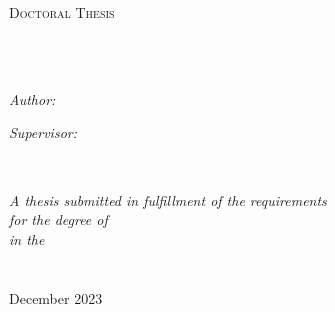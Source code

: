 \documentclass[
11pt, 
english, 
doublespacing, %
headsepline, %
usenames,dvipsnames
]{dissertation_class} %
\author{Benjamin Randolph \textsc{Smithers}} %
\numberwithin{figure}{section}
\numberwithin{table}{section}
\numberwithin{equation}{section}
\begin{document}
\begin{titlepage}
    \begin{center}
    
    \vspace*{.06\textheight}
    {\scshape\LARGE \univname\par}\vspace{1.5cm} %
    \textsc{\Large Doctoral Thesis}\\[0.5cm] %
    
    \HRule \\[0.4cm] %
    {\huge \bfseries \ttitle\par}\vspace{0.4cm} %
    \HRule \\[1.5cm] %
     
    \begin{minipage}[t]{0.4\textwidth}
    \begin{flushleft} \large
    \emph{Author:}\\
    \href{https://nures.uta.edu/collaborators/}{\authorname} %
    \end{flushleft}
    \end{minipage}
    \begin{minipage}[t]{0.4\textwidth}
    \begin{flushright} \large
    \emph{Supervisor:} \\
    \href{https://nures.uta.edu/collaborators/}{\supname} %
    \end{flushright}
    \end{minipage}\\[1.5cm]
     
    \vfill
    
    \large \textit{A thesis submitted in fulfillment of the requirements\\ for the degree of \degreename}\\[0.3cm] %
    \textit{in the}\\[0.4cm]
    \groupname\\\deptname\\[2cm] %
     
    
    {\large December 2023}\\[1cm] %

    \end{center}
\end{titlepage}
    
\end{document}
